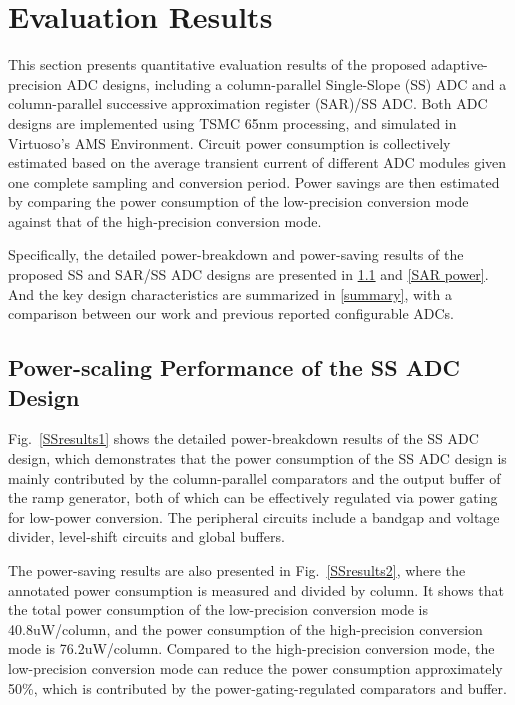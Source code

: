 \section{Evaluation Results}\label{result}

This section presents quantitative evaluation results of the proposed adaptive-precision ADC 
designs, including a column-parallel Single-Slope (SS) ADC and a column-parallel successive 
approximation register (SAR)/SS ADC. Both ADC designs are implemented using TSMC 65nm processing,
and simulated in Virtuoso’s AMS Environment. Circuit power consumption is collectively estimated
based on the average transient current of different ADC modules given one complete sampling and 
conversion period. Power savings are then estimated by comparing the power consumption of the
low-precision conversion mode against that of the high-precision conversion mode. 

Specifically, the detailed power-breakdown and power-saving results of the proposed SS and SAR/SS ADC designs are presented in \ref{SS power} and \ref{SAR power}. And the key design characteristics are summarized in \ref{summary}, with a comparison between our work and previous reported configurable ADCs.

\subsection{Power-scaling Performance of the SS ADC Design}\label{SS power}

Fig.~\ref{SSresults1} shows the detailed power-breakdown results of the SS ADC design,
which demonstrates that the power consumption of the SS ADC design is mainly contributed by 
the column-parallel comparators and the output buffer of the ramp generator, both of which 
can be effectively regulated via power gating for low-power conversion. The peripheral circuits include a bandgap and voltage divider, level-shift circuits and global buffers.

The power-saving results are also presented in Fig.~\ref{SSresults2}, where the annotated power consumption is measured and divided by column. It shows that the total power consumption of the low-precision conversion mode is 40.8uW/column, and the power consumption of the high-precision conversion mode is 76.2uW/column. 
Compared to the high-precision conversion mode, the low-precision conversion mode can reduce 
the power consumption approximately 50\%, which is contributed by the power-gating-regulated comparators and buffer.

